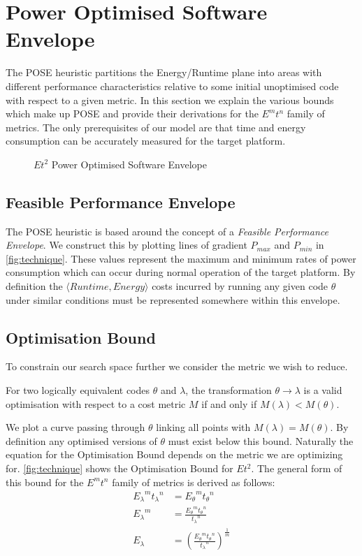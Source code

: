 \section{Power Optimised Software Envelope}
\label{sec:pose}
The POSE heuristic partitions the Energy/Runtime plane into areas with different performance characteristics relative to some initial unoptimised code with respect to a given metric.
In this section we explain the various bounds which make up POSE and provide their derivations for the $E^mt^n$ family of metrics.
The only prerequisites of our model are that time and energy consumption can be accurately measured for the target platform.

\begin{figure}
\centering

\caption{$Et^2$ Power Optimised Software Envelope}
\label{fig:technique}
\end{figure}

\subsection{Feasible Performance Envelope}
The POSE heuristic is based around the concept of a \emph{Feasible Performance Envelope}.
We construct this by plotting lines of gradient $P_{max}$ and $P_{min}$ in \autoref{fig:technique}.
These values represent the maximum and minimum rates of power consumption which can occur during normal operation of the target platform.
By definition the $\langle Runtime, Energy\rangle$ costs incurred by running any given code $\theta$ under similar conditions must be represented somewhere within this envelope.

\subsection{Optimisation Bound}
To constrain our search space further we consider the metric we wish to reduce.

\begin{definition}
For two logically equivalent codes $\theta$ and $\lambda$, the transformation ${\theta \to \lambda}$ is a valid optimisation with respect to a cost metric $M$ if and only if ${M(\lambda) < M(\theta)}$.
\end{definition}

We plot a curve passing through $\theta$ linking all points with ${M(\lambda) = M(\theta)}$. By definition any optimised versions of $\theta$ must exist below this bound.
Naturally the equation for the Optimisation Bound depends on the metric we are optimizing for.
\autoref{fig:technique} shows the Optimisation Bound for $Et^2$.
The general form of this bound for the $E^mt^n$ family of metrics is derived as follows:
\begin{align}
 {E_\lambda}^m{t_\lambda}^n &= {E_\theta}^m{t_\theta}^n \nonumber \\
 {E_\lambda}^m &= \frac{{E_\theta}^m{t_\theta}^n}{{t_\lambda}^n} \nonumber \\
  E_\lambda &= (\frac{{E_\theta}^m{t_\theta}^n}{{t_\lambda}^n})^\frac{1}{m}
\label{eq:optimisation}
\end{align}

